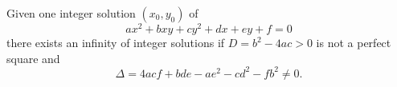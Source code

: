 \begin{proposition}
    Given one integer solution $(x_0,y_0)$ of
\[
    ax^2+bxy+cy^2+dx+ey+f=0
\]
    there exists an infinity of integer solutions if $D=b^2-4ac>0$ is not a perfect square and
\[
    \Delta=4acf+bde-ae^2-cd^2-fb^2\ne0.
\]
\end{proposition}
